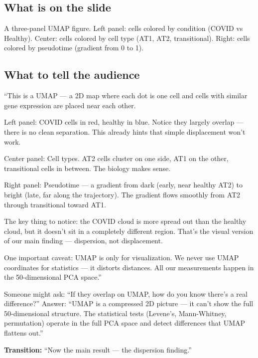\documentclass[11pt]{article}
\begin{document}
\subsection{What is on the slide}

A three-panel UMAP figure. Left panel: cells colored by condition (COVID vs Healthy). Center: cells colored by cell type (AT1, AT2, transitional). Right: cells colored by pseudotime (gradient from 0 to 1).

\subsection{What to tell the audience}

\begin{speaknote}
``This is a UMAP --- a 2D map where each dot is one cell and cells with similar gene expression are placed near each other.

Left panel: COVID cells in red, healthy in blue. Notice they largely overlap --- there is no clean separation. This already hints that simple displacement won't work.

Center panel: Cell types. AT2 cells cluster on one side, AT1 on the other, transitional cells in between. The biology makes sense.

Right panel: Pseudotime --- a gradient from dark (early, near healthy AT2) to bright (late, far along the trajectory). The gradient flows smoothly from AT2 through transitional toward AT1.

The key thing to notice: the COVID cloud is more spread out than the healthy cloud, but it doesn't sit in a completely different region. That's the visual version of our main finding --- dispersion, not displacement.

One important caveat: UMAP is only for visualization. We never use UMAP coordinates for statistics --- it distorts distances. All our measurements happen in the 50-dimensional PCA space.''
\end{speaknote}

\begin{pitfall}
Someone might ask: ``If they overlap on UMAP, how do you know there's a real difference?'' Answer: ``UMAP is a compressed 2D picture --- it can't show the full 50-dimensional structure. The statistical tests (Levene's, Mann-Whitney, permutation) operate in the full PCA space and detect differences that UMAP flattens out.''
\end{pitfall}

\textbf{Transition:} ``Now the main result --- the dispersion finding.''
\end{document}
